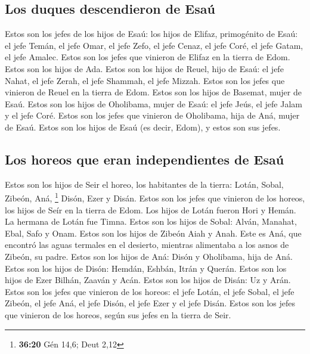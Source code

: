 \hypertarget{los-duques-descendieron-de-esauxfa}{%
\subsection{Los duques descendieron de
Esaú}\label{los-duques-descendieron-de-esauxfa}}

 Estos son los jefes de los hijos de Esaú: los hijos de
Elifaz, primogénito de Esaú: el jefe Temán, el jefe Omar, el jefe Zefo,
el jefe Cenaz,  el jefe Coré, el jefe Gatam, el jefe
Amalec. Estos son los jefes que vinieron de Elifaz en la tierra de Edom.
Estos son los hijos de Ada.  Estos son los hijos de
Reuel, hijo de Esaú: el jefe Nahat, el jefe Zerah, el jefe Shammah, el
jefe Mizzah. Estos son los jefes que vinieron de Reuel en la tierra de
Edom. Estos son los hijos de Basemat, mujer de Esaú. 
Estos son los hijos de Oholibama, mujer de Esaú: el jefe Jeús, el jefe
Jalam y el jefe Coré. Estos son los jefes que vinieron de Oholibama,
hija de Aná, mujer de Esaú.  Estos son los hijos de Esaú
(es decir, Edom), y estos son sus jefes.

\hypertarget{los-horeos-que-eran-independientes-de-esauxfa}{%
\subsection{Los horeos que eran independientes de
Esaú}\label{los-horeos-que-eran-independientes-de-esauxfa}}

 Estos son los hijos de Seir el horeo, los habitantes de
la tierra: Lotán, Sobal, Zibeón, Aná, \footnote{\textbf{36:20} Gén 14,6;
  Deut 2,12}  Disón, Ezer y Disán. Estos son los jefes
que vinieron de los horeos, los hijos de Seír en la tierra de Edom.
 Los hijos de Lotán fueron Hori y Hemán. La hermana de
Lotán fue Timna.  Estos son los hijos de Sobal: Alván,
Manahat, Ebal, Safo y Onam.  Estos son los hijos de
Zibeón Aiah y Anah. Este es Aná, que encontró las aguas termales en el
desierto, mientras alimentaba a los asnos de Zibeón, su padre.
 Estos son los hijos de Aná: Disón y Oholibama, hija de
Aná.  Estos son los hijos de Disón: Hemdán, Eshbán, Itrán
y Querán.  Estos son los hijos de Ezer Bilhán, Zaaván y
Acán.  Estos son los hijos de Disán: Uz y Arán.
 Estos son los jefes que vinieron de los horeos: el jefe
Lotán, el jefe Sobal, el jefe Zibeón, el jefe Aná,  el
jefe Disón, el jefe Ezer y el jefe Disán. Estos son los jefes que
vinieron de los horeos, según sus jefes en la tierra de Seir.

